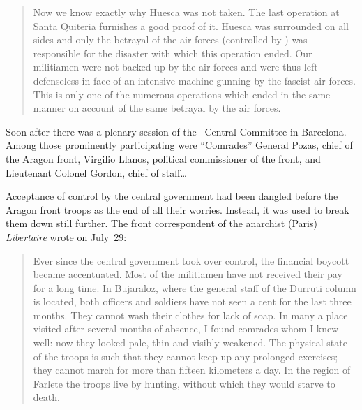 \vspace{-0.33\baselineskip}

\begin{quotation}
  Now we know exactly why Huesca was not taken. The last operation at Santa Quiteria furnishes a good proof of it. Hues\-ca was surrounded on all sides and only the betrayal of the air forces (controlled by \PSUC) was responsible for the disaster with which this operation ended. Our militiamen were not backed up by the air forces and were thus left defenseless in face of an intensive machine-gunning by the fascist air forces. This is only one of the numerous operations which ended in the same manner on account of the same betrayal by the air forces.
\end{quotation}

\vspace{-0.33\baselineskip}

\indexPSUC\indexSPozas
Soon after there was a plenary session of the \PSUC\ Central Committee in Barcelona. Among those prominently participating were ``Comrades'' General Pozas, chief of the Aragon front, Virgilio Llanos, political commissioner of the front, and Lieutenant Colonel Gordon, chief of staff\dots

Acceptance of control by the central government had been dangled before the Aragon front troops as the end of all their worries. Instead, it was used to break them down still further. The front correspondent of the anarchist (Paris) \emph{Libertaire} wrote on July~29:

\begin{quotation}
  Ever since the central government took over control, the financial boycott became accentuated. Most of the militiamen have not received their pay for a long time. In Bujaraloz, where the general staff of the Durruti column is located, both officers and soldiers have not seen a cent for the last three months. They cannot wash their clothes for lack of soap. In many a place visited after several months of absence, I found comrades whom I knew well: now they looked pale, thin and visibly weakened. The physical state of the troops is such that they cannot keep up any prolonged exercises; they cannot march for more than fifteen kilometers a day. In the region of Farlete the troops live by hunting, without which they would starve to death.
\end{quotation}

